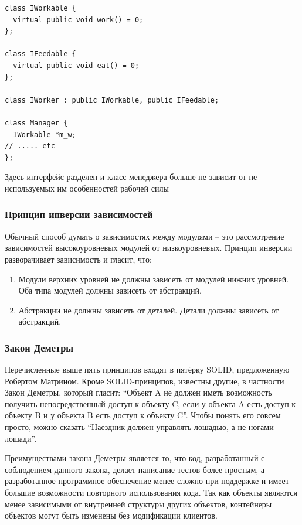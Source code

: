\documentclass[a4paper,12pt,oneside]{article}
\begin{document}
\begin{lstlisting}
class IWorkable {
  virtual public void work() = 0;
};

class IFeedable {
  virtual public void eat() = 0;
};

class IWorker : public IWorkable, public IFeedable;

class Manager {
  IWorkable *m_w;
// ..... etc
};
\end{lstlisting}

Здесь интерфейс разделен и класс менеджера больше не зависит от не используемых им особенностей рабочей силы

\subsubsection{Принцип инверсии зависимостей}\label{DIP}

Обычный способ думать о зависимостях между модулями -- это рассмотрение зависимостей высокоуровневых модулей от низкоуровневых. Принцип инверсии разворачивает зависимость и гласит, что:

\begin{enumerate}
\item Модули верхних уровней не должны зависеть от модулей нижних уровней. Оба типа модулей должны зависеть от абстракций.
\item Абстракции не должны зависеть от деталей. Детали должны зависеть от абстракций.
\end{enumerate}

\subsubsection{Закон Деметры}\label{DemeterLaw}

Перечисленные выше пять принципов входят в пятёрку SOLID, предложенную Робертом Матрином. Кроме SOLID-принципов, известны другие, в частности Закон Деметры, который гласит: ``Объект A не должен иметь возможность получить непосредственный доступ к объекту C, если у объекта A есть доступ к объекту B и у объекта B есть доступ к объекту C''. Чтобы понять его совсем просто, можно сказать ``Наездник должен управлять лошадью, а не ногами лошади''.

Преимуществами закона Деметры является то, что код, разработанный с соблюдением данного закона, делает написание тестов более простым, а разработанное программное обеспечение менее сложно при поддержке и имеет большие возможности повторного использования кода. Так как объекты являются менее зависимыми от внутренней структуры других объектов, контейнеры объектов могут быть изменены без модификации клиентов.
\end{document}
